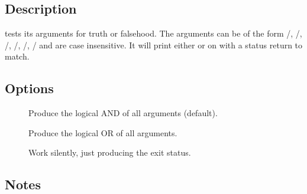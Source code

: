 \begin{synopsis}
\end{synopsis}

\subsection*{Description}

 tests its arguments for truth or falsehood.  The arguments can be
of the form /, /, /,
/, /, / and are case
insensitive.  It will print either  or  on
 with a status return to match.

\subsection*{Options}

\begin{description}
\item[]
   Produce the logical AND of all arguments (default).

\item[]
   Produce the logical  OR of all arguments.

\item[]
   Work silently, just producing the exit status.
\end{description}

\subsection*{Notes}

